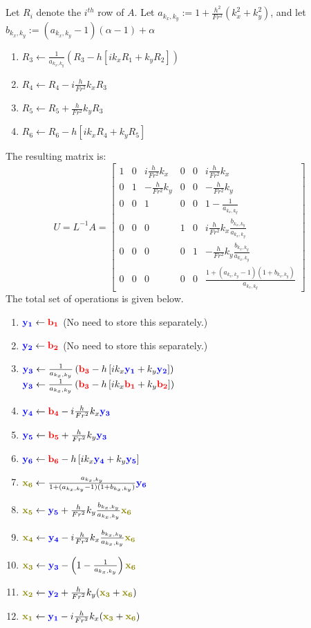 \documentclass[10pt]{article}
\newcommand{\mbfb}[1]{{\color{blue}\mathbf{#1}}}
\newcommand{\mbfr}[1]{{\color{red}\mathbf{#1}}}
\newcommand{\mbfg}[1]{{\color{olive}\mathbf{#1}}}
\begin{document}
 Let $R_i$ denote the $i^{th}$ row of $A$. Let $a_{k_x, k_y}:= 1+\frac{h^2}{Fr^2}(k_x^2+k_y^2)$, and let $b_{k_x, k_y}:= (a_{k_x, k_y}-1)(\alpha - 1)+\alpha$
\begin{enumerate}
	\item $R_3 \gets \frac{1}{a_{k_x, k_y}} \left(R_3 -h \left[i k_x R_1 + k_y R_2\right]\right)$
	\item $R_4 \gets R_4 - i \frac{h}{Fr^2}k_x R_3$
	\item $R_5 \gets R_5 + \frac{h}{Fr^2}k_y R_3$
	\item $R_6 \gets R_6 -h \left[ik_x R_4 +k_y R_5\right]$
\end{enumerate}
The resulting matrix is: \[U = L^{-1}A = 
\begin{bmatrix}
1 & 0 & i \frac{h}{Fr^2}k_x & 0 & 0 & i \frac{h}{Fr^2}k_x \\
0 & 1 & -\frac{h}{Fr^2}k_y & 0 & 0 & -\frac{h}{Fr^2}k_y \\
0 & 0 & 1 & 0 & 0 & 1 -\frac{1}{a_{k_x, k_y}} \\ 
0 & 0 & 0 & 1 & 0 & i \frac{h}{Fr^2}k_x \frac{b_{k_x,k_y}}{a_{k_x, k_y}} \\
0 & 0 & 0 & 0 & 1 & -\frac{h}{Fr^2}k_y \frac{b_{k_x, k_y}}{a_{k_x, k_y}} \\
0 & 0 & 0 & 0 & 0 & \frac{1+(a_{k_x, k_y}-1)(1+b_{k_x, k_y})}{a_{k_x, k_y}}
\end{bmatrix}\] 
The total set of operations is given below.
\begin{enumerate}
	\item $\mbfb{y_1}\gets \mbfr{b_1}$ (No need to store this separately.)
	\item $\mbfb{y_2}\gets \mbfr{b_2}$ (No need to store this separately.)
	\item $\mbfb{y_3} \gets \frac{1}{a_{k_x, k_y}} \left(\mbfr{b_3} -h \left[i k_x \mbfb{y_1} + k_y \mbfb{y_2}\right]\right)$ \\ 
	$\mbfb{y_3} \gets \frac{1}{a_{k_x, k_y}} \left(\mbfr{b_3} -h \left[i k_x \mbfr{b_1} + k_y \mbfr{b_2}\right]\right)$ 
	\item $\mbfb{y_4} \gets \mbfr{b_4} - i \frac{h}{Fr^2}k_x \mbfb{y_3}$
	\item $\mbfb{y_5} \gets \mbfr{b_5} + \frac{h}{Fr^2}k_y \mbfb{y_3}$
	\item $\mbfb{y_6} \gets \mbfr{b_6} -h \left[ik_x \mbfb{y_4} +k_y\mbfb{y_5}\right]$
	\item $\mbfg{x_6} \gets \frac{a_{k_x, k_y}}{1+(a_{k_x, k_y}-1)(1+b_{k_x, k_y})}\mbfb{y_6}$
	\item $\mbfg{x_5} \gets \mbfb{y_5} +\frac{h}{Fr^2}k_y \frac{b_{k_x,k_y}}{a_{k_x,k_y}}\mbfg{x_6}$
	\item $\mbfg{x_4} \gets \mbfb{y_4} - i \frac{h}{Fr^2}k_x\frac{b_{k_x,k_y}}{a_{k_x,k_y}}\mbfg{x_6}$
	\item $\mbfg{x_3} \gets \mbfb{y_3} - \left(1-\frac{1}{a_{k_x,k_y}}\right)\mbfg{x_6}$
	\item $\mbfg{x_2}\gets \mbfb{y_2} + \frac{h}{Fr^2}k_y(\mbfg{x_3}+\mbfg{x_6})$
	\item $\mbfg{x_1} \gets \mbfb{y_1} - i \frac{h}{Fr^2}k_x(\mbfg{x_3}+\mbfg{x_6})$
\end{enumerate}
\end{document}
